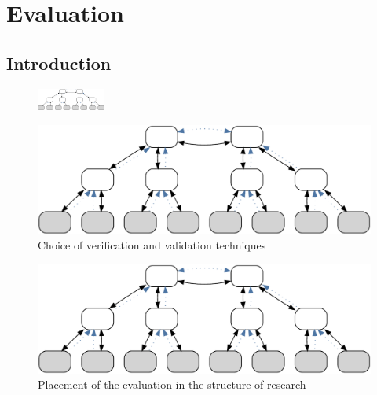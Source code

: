 \cleardoublepage
\chapter{Evaluation}\label{sec:eval}\minitoc\vspace{.5cm}

\section{Introduction}

\begin{figure}
    \centering
    \includegraphics[width=0.2\textwidth]{resources/images/example3}
\end{figure}


\begin{figure}[htbp]
    \centering
    \includegraphics[width=.8\textwidth]{resources/images/example3}
    \caption{Choice of verification and validation techniques~\cite{li2002design}}\label{sec:eval:tec}
\end{figure}



\begin{figure}[htpb]
    \centering
    \includegraphics[width=.55\textwidth]{resources/images/example3}
    \caption{Placement of the evaluation in the structure of research}\label{fig:hourglass:evaluation}
\end{figure}

